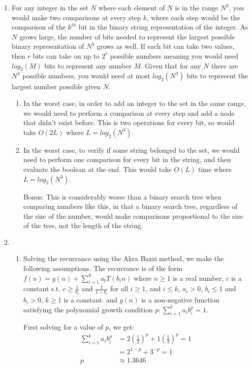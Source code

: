 \documentclass[11pt,a4paper]{article}
\begin{document}
\begin{enumerate}
		\item For any integer in the set $N$ where each element of $N$ is in the range $N^3$, you would make two comparisons at every step $k$, where each step would be the comparison of the $k^{th}$ bit in the binary string representation of the integer. As $N$ grows large, the number of bits needed to represent the largest possible binary representation of $N^3$ grows as well. If each bit can take two values, then $r$ bits can take on up to $2^r$ possible numbers meaning you would need $log_2 (M)$ bits to represent any number $M$. Given that for any $N$ there are $N^3$ possible numbers, you would need at most $log_2 (N^3)$ bits to represent the largest number possible given $N$.
		\begin{enumerate}
		\item In the worst case, in order to add an integer to the set in the same range, we would need to perform a comparison at every step and add a node that didn't exist before. This is two operations for every bit, so would take $O(2L)$ where $L=log_2 (N^3)$.
		\item In the worst case, to verify if some string belonged to the set, we would need to perform one comparison for every bit in the string, and then evaluate the boolean at the end. This would take $O(L)$ time where $L=log_2 (N^3)$.
		\end{enumerate}
		\begin{itemize}
			\item [Bonus:] This is considerably worse than a binary search tree when comparing numbers like this, in that a binary search tree, regardless of the size of the number, would make comparisons proportional to the size of the tree, not the length of the string.
		\end{itemize}
		
		\item
		\begin{enumerate}
			\item Solving the recurrance using the Akra Bazzi method, we make the following assumptions. The recurrance is of the form $f(n) = g(n) + \sum_{i=1}^{k} a_tT(b_i n)$ where $n \geq 1$ is a real number, $c$ is a constant s.t. $c \geq \frac{1}{b_i}$ and $\frac{1}{1 - b_i}$ for all $i \geq 1$, and $i \leq k$, $a_i > 0$, $b_i \leq 1$ and $b_i > 0$, $k \geq 1$ is a constant. and $g(n)$ is a non-negative function satisfying the polynomial growth condition $p: \sum_{i=1}^{k} a_i b_{i}^p = 1$.
			
			First solving for a value of $p$, we get:
			\begin{align*}
				\sum_{i=1}^{k} a_i b_{i}^p &= 2(\frac{1}{2})^p + 1(\frac{1}{3})^p = 1 \\
				&= 2^{1-p} + 3^{-p} = 1 \\
				p &\approx 1.3646  
			\end{align*}
			

\end{enumerate}
\end{enumerate}
\end{document}
